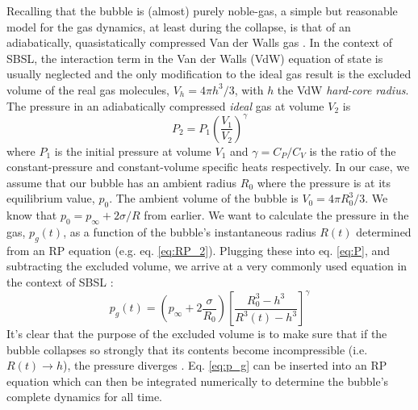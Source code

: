 \documentclass[11pt,prb,aps,nofootinbib,superscriptaddress,floatfix]{revtex4-2}
\begin{document}

Recalling that the bubble is (almost) purely noble-gas, a simple but reasonable model for the gas dynamics, at least during the collapse, is that of an adiabatically, quasistatically compressed Van der Walls gas \cite{brenner2002single,lofstedt1995sonoluminescing,barber1997defining,lofstedt1993toward,hilgenfeldt1999simple}. In the context of SBSL, the interaction term in the Van der Walls (VdW) equation of state is usually neglected and the only modification to the ideal gas result is the excluded volume of the real gas molecules, $V_h = 4 \pi h^3/3$, with $h$ the VdW \emph{hard-core radius}. The pressure in an adiabatically compressed \emph{ideal} gas at volume $V_2$ is \cite{schroeder1999introduction}
\begin{equation}
    P_2 = P_1 \left(\frac{V_1}{V_2}\right)^\gamma
\label{eq:P}
\end{equation}
where $P_1$ is the initial pressure at volume $V_1$ and $\gamma=C_P/C_V$ is the ratio of the constant-pressure and constant-volume specific heats respectively. In our case, we assume that our bubble has an ambient radius $R_0$ where the pressure is at its equilibrium value, $p_0$. The ambient volume of the bubble is $V_0 =  4 \pi R_0^3/3$. We know that $p_0=p_\infty+2\sigma /R$ from earlier. We want to calculate the pressure in the gas, $p_g(t)$, as a function of the bubble's instantaneous radius $R(t)$ determined from an RP equation (e.g. eq. \ref{eq:RP_2}). Plugging these into eq. \ref{eq:P}, and subtracting the excluded volume, we arrive at a very commonly used equation in the context of SBSL \cite{brenner2002single,lofstedt1995sonoluminescing,barber1997defining,lofstedt1993toward,hilgenfeldt1999simple,sivasubramanian2002temperature}:
\begin{equation}
    p_g(t) = \left( p_\infty+2\frac{\sigma}{R_0} \right) \left[ \frac{R_0^3-h^3}{R^3(t)-h^3} \right] ^ \gamma
    \label{eq:p_g}
\end{equation}
It's clear that the purpose of the excluded volume is to make sure that if the bubble collapses so strongly that its contents become incompressible (i.e. $R(t)\rightarrow h$), the pressure diverges \cite{lofstedt1993toward,brenner2002single}. Eq. \ref{eq:p_g} can be inserted into an RP equation which can then be integrated numerically to determine the bubble's complete dynamics for all time. 
\end{document}
